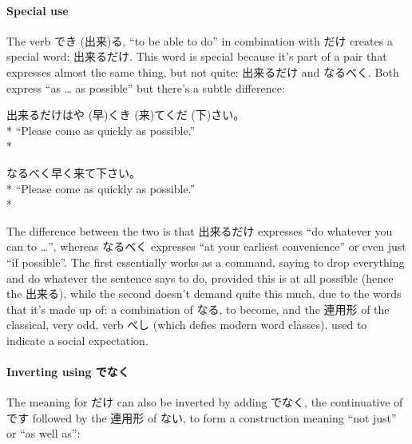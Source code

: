 \documentclass[11pt, b5paper, twoside, openright, onecolumn]{book}
\makeatletter
\newcommand*{\rubystack}[2]{{\relscale{0.5}%
  \begin{tabular}[b]{@{}c@{}}%
    {#1}\\%
   {\textscale{2}{#2}}%
  \end{tabular}}%
}
\DeclareRobustCommand*{\ruby}[2]{%
  \mbox{%
    \setlength{\parskip}{0ex}%
    \BeginAccSupp{method=pdfstringdef,ActualText={#1}}%
      \rubystack{\phantom{#2}}{#1}%
      \llap{%
        \rubystack{#2}{\phantom{#1}}%
      }%
    \EndAccSupp{}%
  }%
}
\renewcommand*{\ruby}[2]{#2 (#1)}%
\newenvironment{exampleblock}{
\setlength{\parindent}{0.6in}
\begin{minipage}[t]{\dimexpr\textwidth-\parindent}}
{\end{minipage}}
\makeatother
\begin{document}
\paragraph{Special use}

The verb \ruby{出来}{でき}る‚ “to be able to do” in combination with だけ creates a special word: 出来るだけ. This word is special because it’s part of a pair that expresses almost the same thing‚ but not quite: 出来るだけ and なるべく. Both express “as … as possible” but there’s a subtle difference:

\vspace{0.4cm}
\begin{exampleblock}
出来るだけ\ruby{早}{はや}く\ruby{来}{き}て\ruby{下}{くだ}さい。 \\* 
“Please come as quickly as possible.” \\* 
\end{exampleblock}
\vspace{0.2cm}

\begin{exampleblock}
なるべく早く来て下さい。 \\* 
“Please come as quickly as possible.” \\* 
\end{exampleblock}
\vspace{0.2cm}

The difference between the two is that 出来るだけ expresses “do whatever you can to …”‚ whereas なるべく expresses “at your earliest convenience” or even just “if possible”. The first essentially works as a command‚ saying to drop everything and do whatever the sentence says to do‚ provided this is at all possible (hence the 出来る)‚ while the second doesn’t demand quite this much‚ due to the words that it’s made up of: a combination of なる‚ to become‚ and the 連用形 of the classical‚ very odd‚ verb べし (which defies modern word classes)‚ used to indicate a social expectation.

\paragraph{Inverting using でなく}

The meaning for だけ can also be inverted by adding でなく‚ the continuative of です followed by the 連用形 of ない‚ to form a construction meaning “not just” or “as well as”:
\end{document}
